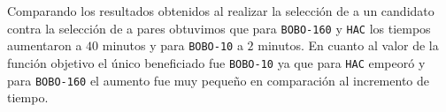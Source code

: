 Comparando los resultados obtenidos al realizar la selección de a un candidato contra la selección de a pares obtuvimos que para \texttt{BOBO-160} y \texttt{HAC} los tiempos aumentaron a $40$ minutos y para \texttt{BOBO-10} a $2$ minutos. En cuanto al valor de la función objetivo el único beneficiado fue \texttt{BOBO-10} ya que para \texttt{HAC} empeoró y para \texttt{BOBO-160} el aumento fue muy pequeño en comparación al incremento de tiempo.
